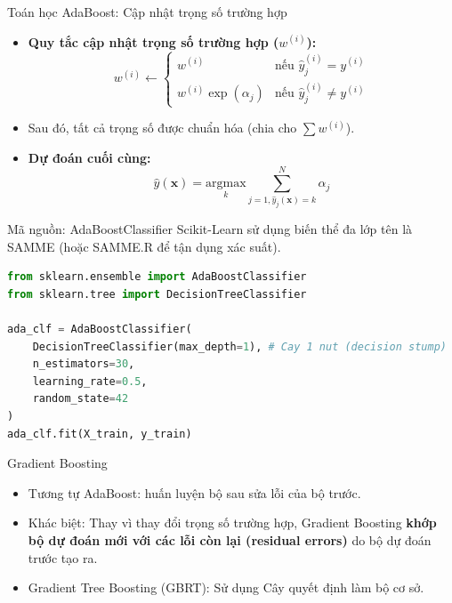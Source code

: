 \documentclass[aspectratio=169]{beamer}
\begin{document}
\begin{frame}{Toán học AdaBoost: Cập nhật trọng số trường hợp}
    \begin{itemize}
        \item \textbf{Quy tắc cập nhật trọng số trường hợp ($w^{(i)}$):}
            \begin{equation}
                w^{(i)} \leftarrow 
                \begin{cases} 
                w^{(i)} & \text{nếu } \hat{y}_j^{(i)} = y^{(i)} \\
                w^{(i)} \exp(\alpha_j) & \text{nếu } \hat{y}_j^{(i)} \neq y^{(i)}
                \end{cases}
            \end{equation}
        \item Sau đó, tất cả trọng số được chuẩn hóa (chia cho $\sum w^{(i)}$).
        \item \textbf{Dự đoán cuối cùng:}
            \begin{equation}
                \hat{y}(\mathbf{x}) = \underset{k}{\mathrm{argmax}} \sum_{j=1, \hat{y}_j(\mathbf{x}) = k}^N \alpha_j
            \end{equation}
    \end{itemize}
\end{frame}

\begin{frame}[fragile]{Mã nguồn: AdaBoostClassifier}
    Scikit-Learn sử dụng biến thể đa lớp tên là SAMME (hoặc SAMME.R để tận dụng xác suất).
    \begin{lstlisting}[language=Python]
from sklearn.ensemble import AdaBoostClassifier
from sklearn.tree import DecisionTreeClassifier

ada_clf = AdaBoostClassifier(
    DecisionTreeClassifier(max_depth=1), # Cay 1 nut (decision stump)
    n_estimators=30,
    learning_rate=0.5, 
    random_state=42
)
ada_clf.fit(X_train, y_train)
    \end{lstlisting}
\end{frame}

\begin{frame}{Gradient Boosting}
    \begin{itemize}
        \item Tương tự AdaBoost: huấn luyện bộ sau sửa lỗi của bộ trước.
        \item Khác biệt: Thay vì thay đổi trọng số trường hợp, Gradient Boosting \textbf{khớp bộ dự đoán mới với các lỗi còn lại (residual errors)} do bộ dự đoán trước tạo ra.
        \item Gradient Tree Boosting (GBRT): Sử dụng Cây quyết định làm bộ cơ sở.
    \end{itemize}
\end{frame}
\end{document}
